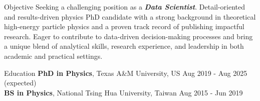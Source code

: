 \documentclass{resume}
\begin{document}
\vspace{-2.75em}

\begin{rSection}{Objective}
    Seeking a challenging position as a \textbf{\textit{Data Scientist}}.
    Detail-oriented and results-driven physics PhD candidate with a strong background in theoretical high-energy particle physics and a proven track record of publishing impactful research.
    Eager to contribute to data-driven decision-making processes and bring a unique blend of analytical skills, research experience, and leadership in both academic and practical settings.
\end{rSection}


\begin{rSection}{Education}
{\bf PhD in Physics}, Texas A\&M University, US \hfill {Aug 2019 - Aug 2025 (expected)} \\
{\bf BS in Physics}, National Tsing Hua University, Taiwan \hfill {Aug 2015 - Jun 2019}
\end{rSection}
\end{document}
